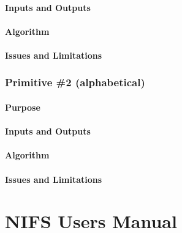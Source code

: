 \documentclass[letterpaper,10pt,english]{sphinxmanual}
\begin{document}
\subsubsection{Inputs and Outputs}
\label{GSAOI/primitives_pages/primitive1:inputs-and-outputs}

\subsubsection{Algorithm}
\label{GSAOI/primitives_pages/primitive1:algorithm}

\subsubsection{Issues and Limitations}
\label{GSAOI/primitives_pages/primitive1:issues-and-limitations}

\subsection{Primitive \#2  (alphabetical)}
\label{GSAOI/primitives_pages/primitive2:primitive-2-alphabetical}\label{GSAOI/primitives_pages/primitive2:gsaoi-primitive-2}\label{GSAOI/primitives_pages/primitive2::doc}

\subsubsection{Purpose}
\label{GSAOI/primitives_pages/primitive2:purpose}

\subsubsection{Inputs and Outputs}
\label{GSAOI/primitives_pages/primitive2:inputs-and-outputs}

\subsubsection{Algorithm}
\label{GSAOI/primitives_pages/primitive2:algorithm}

\subsubsection{Issues and Limitations}
\label{GSAOI/primitives_pages/primitive2:issues-and-limitations}

\chapter{NIFS Users Manual}
\label{NIFScontents::doc}\label{NIFScontents:nifs-users-manual}\label{NIFScontents:id1}
\end{document}
